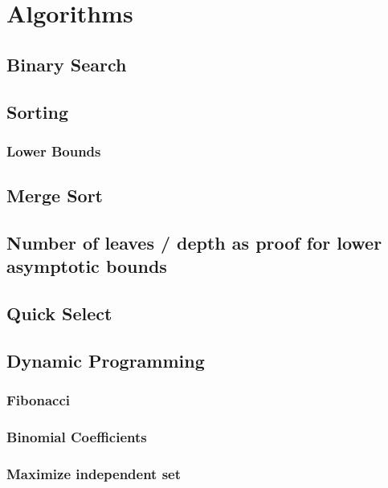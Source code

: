 \documentclass[12pt]{article}
\theoremstyle{definition}
\begin{document}

	\section{Algorithms}

	\subsection{Binary Search}

	\subsection{Sorting}

	\subsubsection{Lower Bounds}

	\subsection{Merge Sort}

	\subsection{Number of leaves / depth as proof for lower asymptotic bounds}

	\subsection{Quick Select}

	\subsection{Dynamic Programming}

	\subsubsection{Fibonacci}

	\subsubsection{Binomial Coefficients}

	\subsubsection{Maximize independent set}
\end{document}
